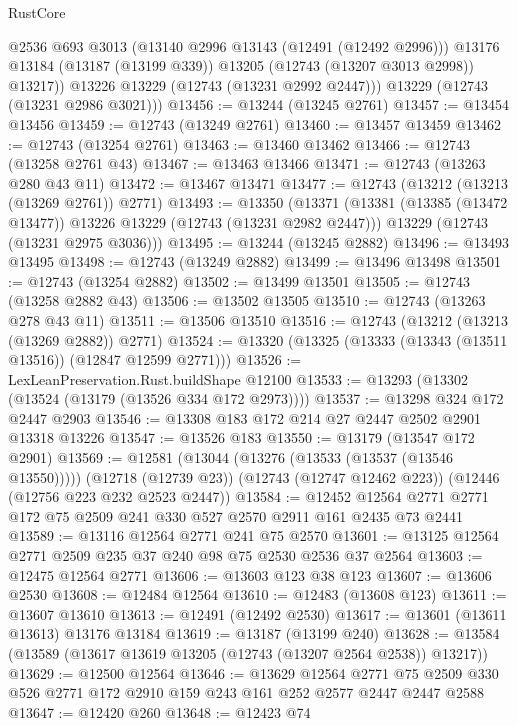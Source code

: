 \begin{lexlean}{RustCore}
\begin{coremodule}
            @2536
            @693
            @3013
            (@13140 @2996 @13143 (@12491 (@12492 @2996)))
            @13176
            @13184
            (@13187 (@13199 @339))
            @13205
            (@12743 (@13207 @3013 @2998))
            @13217))
        @13226
        @13229
        (@12743 (@13231 @2992 @2447)))
      @13229
      (@12743 (@13231 @2986 @3021)))
@13456 := @13244 (@13245 @2761)
@13457 := @13454 @13456
@13459 := @12743 (@13249 @2761)
@13460 := @13457 @13459
@13462 := @12743 (@13254 @2761)
@13463 := @13460 @13462
@13466 := @12743 (@13258 @2761 @43)
@13467 := @13463 @13466
@13471 := @12743 (@13263 @280 @43 @11)
@13472 := @13467 @13471
@13477 := @12743 (@13212 (@13213 (@13269 @2761)) @2771)
@13493 := @13350
    (@13371
      (@13381 (@13385 (@13472 @13477)) @13226 @13229 (@12743 (@13231 @2982 @2447)))
      @13229
      (@12743 (@13231 @2975 @3036)))
@13495 := @13244 (@13245 @2882)
@13496 := @13493 @13495
@13498 := @12743 (@13249 @2882)
@13499 := @13496 @13498
@13501 := @12743 (@13254 @2882)
@13502 := @13499 @13501
@13505 := @12743 (@13258 @2882 @43)
@13506 := @13502 @13505
@13510 := @12743 (@13263 @278 @43 @11)
@13511 := @13506 @13510
@13516 := @12743 (@13212 (@13213 (@13269 @2882)) @2771)
@13524 := @13320 (@13325 (@13333 (@13343 (@13511 @13516)) (@12847 @12599 @2771)))
@13526 := LexLeanPreservation.Rust.buildShape @12100
@13533 := @13293 (@13302 (@13524 (@13179 (@13526 @334 @172 @2973))))
@13537 := @13298 @324 @172 @2447 @2903
@13546 := @13308 @183 @172 @214 @27 @2447 @2502 @2901 @13318 @13226
@13547 := @13526 @183
@13550 := @13179 (@13547 @172 @2901)
@13569 := @12581
    (@13044 (@13276 (@13533 (@13537 (@13546 @13550)))))
    (@12718 (@12739 @23))
    (@12743 (@12747 @12462 @223))
    (@12446 (@12756 @223 @232 @2523 @2447))
@13584 := @12452 @12564 @2771 @2771 @172 @75 @2509 @241 @330 @527 @2570 @2911 @161 @2435 @73 @2441
@13589 := @13116 @12564 @2771 @241 @75 @2570
@13601 := @13125 @12564 @2771 @2509 @235 @37 @240 @98 @75 @2530 @2536 @37 @2564
@13603 := @12475 @12564 @2771
@13606 := @13603 @123 @38 @123
@13607 := @13606 @2530
@13608 := @12484 @12564
@13610 := @12483 (@13608 @123)
@13611 := @13607 @13610
@13613 := @12491 (@12492 @2530)
@13617 := @13601 (@13611 @13613) @13176 @13184
@13619 := @13187 (@13199 @240)
@13628 := @13584 (@13589 (@13617 @13619 @13205 (@12743 (@13207 @2564 @2538)) @13217))
@13629 := @12500 @12564
@13646 := @13629
    @12564
    @2771
    @75
    @2509
    @330
    @526
    @2771
    @172
    @2910
    @159
    @243
    @161
    @252
    @2577
    @2447
    @2447
    @2588
@13647 := @12420 @260
@13648 := @12423 @74

\end{coremodule}
\end{lexlean}
